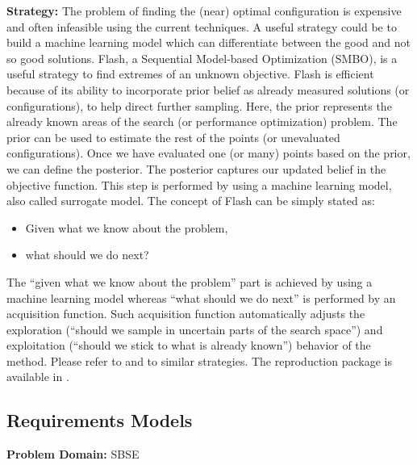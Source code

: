 \documentclass[sigconf,anonymous,review]{acmart}
\begin{document}
\noindent\textbf{Strategy: } The problem of finding the (near) optimal configuration is expensive and often infeasible using the current techniques. A useful strategy could be to build a machine learning model which can differentiate between the good and not so good solutions. Flash, a Sequential Model-based Optimization (SMBO), is a useful
strategy to find extremes of an unknown objective. Flash is
efficient because of its ability to incorporate prior belief as
already measured solutions (or configurations), to help direct
further sampling. Here, the prior represents the already
known areas of the search (or performance optimization) problem. The prior can be used to estimate the rest of the
points (or unevaluated configurations). Once we have evaluated
one (or many) points based on the prior, we can define
the posterior. The posterior captures our updated belief in
the objective function. This step is performed by using a
machine learning model, also called surrogate model. 
The concept of Flash can be simply stated as:
\begin{itemize}
\item Given what we know about the problem,
\item what should we do next?
\end{itemize}
The ``given what we know about the problem'' part is
achieved by using a machine learning model whereas ``what
should we do next'' is performed by an acquisition function.
Such acquisition function automatically adjusts the exploration
(``should we sample in uncertain parts of the search
space'') and exploitation (``should we stick to what is already
known'') behavior of the method. Please refer to  \cite{nair2018finding} and  \cite{nair2017using,nair2017faster} to similar strategies. The reproduction package is available in .


\subsection{Requirements Models}
    \textbf{Problem Domain: } SBSE
    
\end{document}
